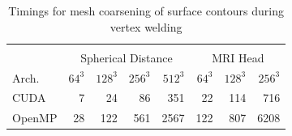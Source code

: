\documentclass[10pt,journal,cspaper,compsoc]{IEEEtran}
\begin{document}
\begin{table}[htb!]
\begin{center}
\caption{Timings for mesh coarsening of surface contours during vertex welding}
\label{tab:timingscoarsening}
\begin{tabular}{l|r r r r|r r r}
\multicolumn{8}{c}{ } \\
 & \multicolumn{4}{|c|}{Spherical Distance} & \multicolumn{3}{|c}{MRI Head}\\
Arch. & $64^3$ & $128^3$ & $256^3$ & $512^3$ & $64^3$ & $128^3$ & $256^3$\\
\hline
CUDA & 7 & 24 & 86 & 351 & 22 & 114 & 716 \\
OpenMP & 28 & 122 & 561 & 2567 & 122 & 807 & 6208 \\
\end{tabular}
\end{center}
\end{table}
\end{document}

